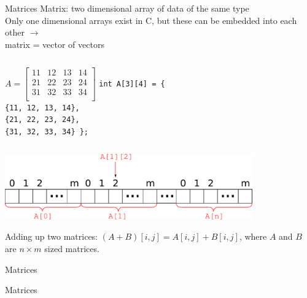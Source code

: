 \documentclass[usenames,dvipsnames,aspectratio=169]{beamer}
\begin{document}
\begin{frame}{Matrices}
  \small
  Matrix: two dimensional array of data of the same type\\
  Only one dimensional arrays exist in C, but these can be embedded into each other $\to$ \\
  \qquad matrix = vector of vectors\\
  \begin{columns}[T]
      \hspace{.25cm} $A = \left[ \begin{array}{cccc}
                     11 & 12 & 13 & 14 \\
                     21 & 22 & 23 & 24 \\
                     31 & 32 & 33 & 34 \\
                   \end{array}
                \right]$
      \texttt{int A[3][4] = \{ \\
      \qquad \{11, 12, 13, 14\},\\
      \qquad \{21, 22, 23, 24\},\\
      \qquad \{31, 32, 33, 34\} \};}
  \end{columns}
  \begin{center}
    \includegraphics[width=0.8\textwidth]{matrix.pdf}
  \end{center}
  Adding up two matrices: $(A+B)[i,j] = A[i,j] + B[i,j]$, where $A$ and $B$ are $n\times m$ sized matrices.\\
\end{frame}

\begin{frame}{Matrices}
  \begin{exampleblock}{}
    \scriptsize
    
  \end{exampleblock}
\end{frame}

\begin{frame}{Matrices}
  \scriptsize
  \begin{exampleblock}{}
    \scriptsize
    \vspace{-.3cm}
    
    \vspace{-.3cm}
  \end{exampleblock}
\end{frame}
\end{document}
